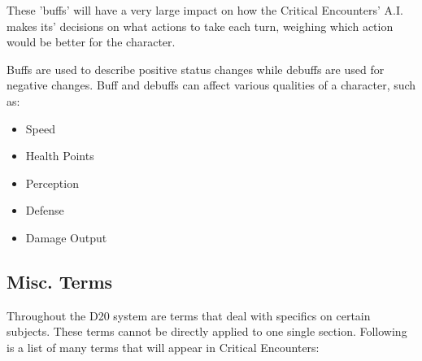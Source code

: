 \documentclass[12pt,a4paper]{report}
\begin{document}
			These 'buffs' will have a very large impact on how the Critical Encounters' A.I. makes its' decisions on what actions to take each turn, weighing which action would be better for the character.
		
			Buffs are used to describe positive status changes while debuffs are used for negative changes. Buff and debuffs can affect various qualities of a character, such as:
			\begin{itemize}
				\item Speed
				\item Health Points
				\item Perception
				\item Defense
				\item Damage Output
			\end{itemize}
		\newpage
		\subsection{Misc. Terms}
			Throughout the D20 system are terms that deal with specifics on certain subjects. These terms cannot be directly applied to one single section. Following is a list of many terms that will appear in Critical Encounters:
\end{document}
